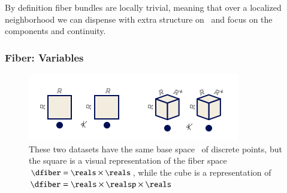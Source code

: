 \documentclass[journal]{vgtc}                %
\begin{document}
By definition fiber bundles are locally trivial\cite{spanier1989algebraic,LocallyTrivialFibre}, meaning that over a localized neighborhood we can dispense with extra structure on \dtotal\ and focus on the components and continuity.
\subsubsection{Fiber: Variables}

\begin{figure}[tb]
  \centering %
  \includegraphics[width=\columnwidth]{fiber.png}
  \caption{These two datasets have the same base space \dbase\ of discrete points, but the square is a visual representation of the fiber space  $\dfiber=\reals\times\reals$, while the cube is a representation of $\dfiber=\reals\times\realsp\times\reals$}
  \label{fig:data_fiber}
\end{figure}
\end{document}
